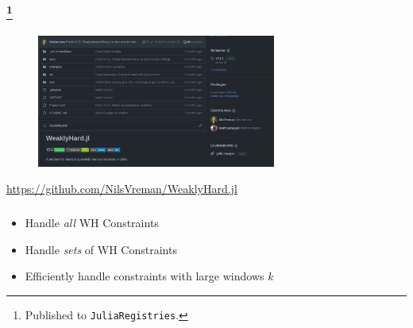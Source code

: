 \begin{frame}
    \frametitle{\tool{}\footnote{Published to \texttt{JuliaRegistries}.}}
    \begin{figure}[h]
        \centering
        \includegraphics[width=0.7\textwidth]{figs/rtas22b/git.png}
    \end{figure}

    \begin{center}
        \Large
        \textcolor{blue}{\url{https://github.com/NilsVreman/WeaklyHard.jl}}
    \end{center}
\end{frame}

\begin{frame}
    \frametitle{\tool{}}

    \begin{itemize}\setlength\itemsep{1em}
        \item Handle \emph{all} WH Constraints
        \item Handle \emph{sets} of WH Constraints
        \item Efficiently handle constraints with large windows $k$
    \end{itemize}
\end{frame}
